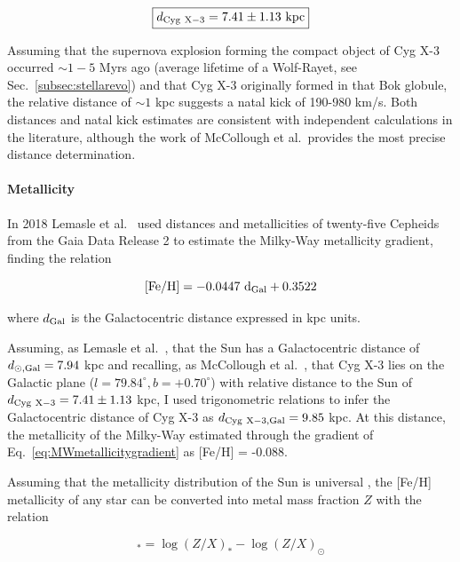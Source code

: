 \documentclass[a4paper,titlepage]{book}     	%
\begin{document}
\begin{equation}\label{eq:distanceCygX3}
    \boxed{d_{\rm Cyg~X-3} = 7.41 \pm 1.13 ~\rm kpc}
\end{equation}



Assuming that the supernova explosion forming the compact object of Cyg X-3 occurred $\sim 1-5$ Myrs ago (average lifetime of a Wolf-Rayet, see Sec.\ \ref{subsec:stellarevo}) and that Cyg X-3 originally formed in that Bok globule, the relative distance of $\sim 1$ kpc suggests a natal kick of 190-980 km/s. Both distances and natal kick estimates are consistent with independent calculations in the literature, although the work of McCollough et al.\ provides the most precise distance determination.

\paragraph{Metallicity}
In 2018 Lemasle et al.\ \cite{MetallicityGradientMW2018Gaia} used distances and metallicities of twenty-five Cepheids from the Gaia Data Release 2 to estimate the Milky-Way metallicity gradient, finding the relation

\begin{equation}\label{eq:MWmetallicitygradient}
    [\rm Fe/H]=-0.0447~d_{\rm Gal} + 0.3522
\end{equation}

where $d_{\rm Gal}$ is the Galactocentric distance expressed in kpc units.

Assuming, as Lemasle et al.\ \cite{MetallicityGradientMW2018Gaia}, that the Sun has a Galactocentric distance of $d_{\rm \odot,Gal} = 7.94$ kpc and recalling, as McCollough et al.\ \cite{CygX-3_McCollough2016_Observation}, that Cyg X-3 lies on the Galactic plane ($l=79.84^\circ, b=+0.70^\circ$) with relative distance to the Sun of $d_{\rm Cyg~X-3} = 7.41 \pm 1.13$ kpc, I used trigonometric relations to infer the Galactocentric distance of Cyg X-3 as $d_{\rm Cyg~X-3, Gal} = 9.85$ kpc. At this distance, the metallicity of the Milky-Way estimated through the gradient of Eq.\ \ref{eq:MWmetallicitygradient} as [Fe/H] = -0.088. 

Assuming that the metallicity distribution of the Sun is universal \cite{metallicityFeHconversion}, the [Fe/H] metallicity of any star can be converted into metal mass fraction $Z$ with the relation 

\begin{equation}
    [\rm Fe/H]_* = \log(Z/X)_* - \log(Z/X)_\odot
\end{equation}
\end{document}
